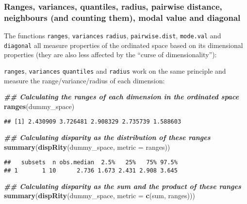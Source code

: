 \documentclass[
]{book}
\newenvironment{Shaded}{\begin{snugshade}}{\end{snugshade}}
\newcommand{\AttributeTok}[1]{\textcolor[rgb]{0.13,0.29,0.53}{#1}}
\newcommand{\DocumentationTok}[1]{\textcolor[rgb]{0.56,0.35,0.01}{\textbf{\textit{#1}}}}
\newcommand{\FunctionTok}[1]{\textcolor[rgb]{0.13,0.29,0.53}{\textbf{#1}}}
\newcommand{\NormalTok}[1]{#1}
\begin{document}
\hypertarget{ranges-variances-quantiles-radius-pairwise-distance-neighbours-and-counting-them-modal-value-and-diagonal}{%
\subsubsection{Ranges, variances, quantiles, radius, pairwise distance, neighbours (and counting them), modal value and diagonal}\label{ranges-variances-quantiles-radius-pairwise-distance-neighbours-and-counting-them-modal-value-and-diagonal}}

The functions \texttt{ranges}, \texttt{variances} \texttt{radius}, \texttt{pairwise.dist}, \texttt{mode.val} and \texttt{diagonal} all measure properties of the ordinated space based on its dimensional properties (they are also less affected by the ``curse of dimensionality''):

\texttt{ranges}, \texttt{variances} \texttt{quantiles} and \texttt{radius} work on the same principle and measure the range/variance/radius of each dimension:

\begin{Shaded}
\begin{Highlighting}[]
\DocumentationTok{\#\# Calculating the ranges of each dimension in the ordinated space}
\FunctionTok{ranges}\NormalTok{(dummy\_space)}
\end{Highlighting}
\end{Shaded}

\begin{verbatim}
## [1] 2.430909 3.726481 2.908329 2.735739 1.588603
\end{verbatim}

\begin{Shaded}
\begin{Highlighting}[]
\DocumentationTok{\#\# Calculating disparity as the distribution of these ranges}
\FunctionTok{summary}\NormalTok{(}\FunctionTok{dispRity}\NormalTok{(dummy\_space, }\AttributeTok{metric =}\NormalTok{ ranges))}
\end{Highlighting}
\end{Shaded}

\begin{verbatim}
##   subsets  n obs.median  2.5%   25%   75% 97.5%
## 1       1 10      2.736 1.673 2.431 2.908 3.645
\end{verbatim}

\begin{Shaded}
\begin{Highlighting}[]
\DocumentationTok{\#\# Calculating disparity as the sum and the product of these ranges}
\FunctionTok{summary}\NormalTok{(}\FunctionTok{dispRity}\NormalTok{(dummy\_space, }\AttributeTok{metric =} \FunctionTok{c}\NormalTok{(sum, ranges)))}
\end{Highlighting}
\end{Shaded}
\end{document}
